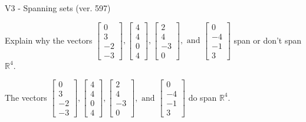 \begin{exercise}
  \begin{exerciseTitle}V3 - Spanning sets (ver. 597)\end{exerciseTitle}
  \begin{exerciseStatement}
    Explain why the vectors \(\left[\begin{array}{r}
0 \\
3 \\
-2 \\
-3
\end{array}\right] , \left[\begin{array}{r}
4 \\
4 \\
0 \\
4
\end{array}\right] , \left[\begin{array}{r}
2 \\
4 \\
-3 \\
0
\end{array}\right] , \text{ and } \left[\begin{array}{r}
0 \\
-4 \\
-1 \\
3
\end{array}\right]\) span or don't span \(\mathbb{R}^4\). 
	


  \end{exerciseStatement}
  \begin{exerciseAnswer}
   The vectors \(\left[\begin{array}{r}
0 \\
3 \\
-2 \\
-3
\end{array}\right] , \left[\begin{array}{r}
4 \\
4 \\
0 \\
4
\end{array}\right] , \left[\begin{array}{r}
2 \\
4 \\
-3 \\
0
\end{array}\right] , \text{ and } \left[\begin{array}{r}
0 \\
-4 \\
-1 \\
3
\end{array}\right]\) 
  	 do  
	span \(\mathbb{R}^4\).
  


  \end{exerciseAnswer}
\end{exercise}